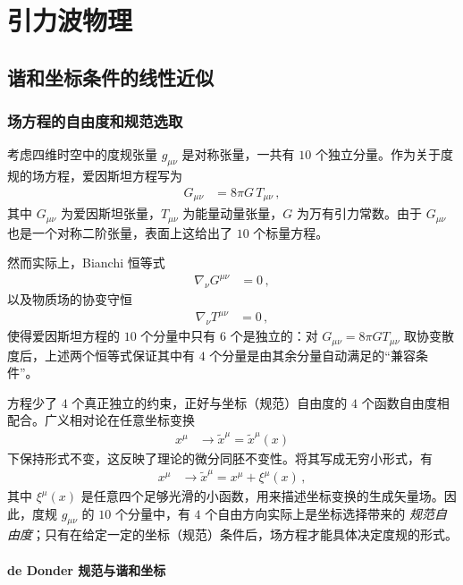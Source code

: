 \section{引力波物理}
\subsection{谐和坐标条件的线性近似}

\subsubsection{场方程的自由度和规范选取}

考虑四维时空中的度规张量 $g_{\mu\nu}$ 是对称张量，一共有 $10$ 个独立分量。作为关于度规的场方程，爱因斯坦方程写为
\begin{align}
G_{\mu\nu} &= 8\pi G\,T_{\mu\nu}\,,
\end{align}
其中 $G_{\mu\nu}$ 为爱因斯坦张量，$T_{\mu\nu}$ 为能量动量张量，$G$ 为万有引力常数。由于 $G_{\mu\nu}$ 也是一个对称二阶张量，表面上这给出了 $10$ 个标量方程。

然而实际上，Bianchi 恒等式
\begin{align}
\nabla_{\nu}G^{\mu\nu} &= 0\,,
\end{align}
以及物质场的协变守恒
\begin{align}
\nabla_{\nu}T^{\mu\nu} &= 0\,,
\end{align}
使得爱因斯坦方程的 $10$ 个分量中只有 $6$ 个是独立的：对 $G_{\mu\nu}=8\pi G T_{\mu\nu}$ 取协变散度后，上述两个恒等式保证其中有 $4$ 个分量是由其余分量自动满足的“兼容条件”。

方程少了 $4$ 个真正独立的约束，正好与坐标（规范）自由度的 $4$ 个函数自由度相配合。广义相对论在任意坐标变换
\begin{align}
x^{\mu} &\longrightarrow \widetilde{x}^{\mu} = \widetilde{x}^{\mu}(x)
\end{align}
下保持形式不变，这反映了理论的微分同胚不变性。将其写成无穷小形式，有
\begin{align}
x^{\mu} &\longrightarrow \widetilde{x}^{\mu} = x^{\mu} + \xi^{\mu}(x)\,,
\end{align}
其中 $\xi^{\mu}(x)$ 是任意四个足够光滑的小函数，用来描述坐标变换的生成矢量场。因此，度规 $g_{\mu\nu}$ 的 $10$ 个分量中，有 $4$ 个自由方向实际上是坐标选择带来的 \emph{规范自由度}；只有在给定一定的坐标（规范）条件后，场方程才能具体决定度规的形式。

\paragraph{de Donder 规范与谐和坐标}

